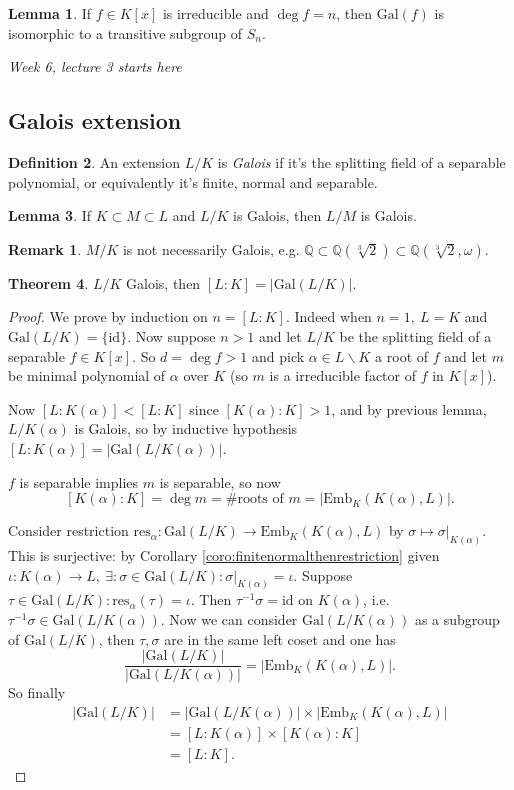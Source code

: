 \documentclass[a4paper]{article}
\newcommand{\Q}{\mathbb Q}
\newcommand{\gal}{\text{Gal}}
\newcommand{\emb}{\text{Emb}}
\newcommand{\id}{\text{id}}
\theoremstyle{definition}
\newtheorem{defn}{Definition}[subsection]
\newtheorem{thm}[defn]{Theorem}
\newtheorem{lemma}[defn]{Lemma}
\newtheorem*{remark}{Remark}
\begin{document}
\begin{lemma}
\label{lemma:irredthengalcongtrans}
If $f\in K[x]$ is irreducible and $\deg f=n$, then $\gal(f)$ is isomorphic to a transitive subgroup of $S_n$.
\end{lemma}

\begin{flushright}
\textit{Week 6, lecture 3 starts here}
\end{flushright}

\subsection{Galois extension}
\begin{defn}
An extension $L/K$ is \textit{Galois} if it's the splitting field of a separable polynomial, or equivalently it's finite, normal and separable.
\end{defn}
\begin{lemma}
\label{lemma:LKgalthenLMgal}
If $K\subset M\subset L$ and $L/K$ is Galois, then $L/M$ is Galois.
\end{lemma}
\begin{remark}
$M/K$ is not necessarily Galois, e.g. $\Q\subset \Q(\sqrt[3]2)\subset \Q(\sqrt[3]2,\omega)$.
\end{remark}

\begin{thm}
\label{thm:honkhonk}
$L/K$ Galois, then $[L:K]=|\gal(L/K)|$.
\end{thm}
\begin{proof}
We prove by induction on $n=[L:K]$. Indeed when $n=1,\ L=K$ and $\gal(L/K)=\{\id\}$. Now suppose $n>1$ and let $L/K$ be the splitting field of a separable $f\in K[x]$. So $d=\deg f>1$ and pick $\alpha\in L\backslash K$ a root of $f$ and let $m$ be minimal polynomial of $\alpha$ over $K$ (so $m$ is a irreducible factor of $f$ in $K[x]$).

Now $[L:K(\alpha)]<[L:K]$ since $[K(\alpha):K]>1$, and by previous lemma, $L/K(\alpha)$ is Galois, so by inductive hypothesis $[L:K(\alpha)]=|\gal(L/K(\alpha))|$.

$f$ is separable implies $m$ is separable, so now
\[
[K(\alpha):K]=\deg m=\# \text{roots of }m=|\emb_K(K(\alpha),L)|.
\]

Consider restriction $\text{res}_\alpha:\gal(L/K)\rightarrow \emb_K(K(\alpha),L)$ by $\sigma\mapsto\sigma|_{K(\alpha)}$. This is surjective: by Corollary \ref{coro:finitenormalthenrestriction} given $\iota:K(\alpha)\rightarrow L,\ \exists:\sigma\in\gal(L/K):\sigma|_{K(\alpha)}=\iota$. Suppose $\tau\in \gal(L/K):\text{res}_\alpha(\tau)=\iota$. Then $\tau^{-1}\sigma=\id$ on $K(\alpha)$, i.e. $\tau^{-1}\sigma\in\gal(L/K(\alpha))$. Now we can consider $\gal(L/K(\alpha))$ as a subgroup of $\gal(L/K)$, then $\tau,\sigma$ are in the same left coset and one has
\[
\frac{|\gal(L/K)|}{|\gal(L/K(\alpha))|}=|\emb_K(K(\alpha),L)|.
\] 
So finally
\[
\begin{aligned}
|\gal(L/K)|&=|\gal(L/K(\alpha))|\times |\emb_K(K(\alpha),L)|\\
&=[L:K(\alpha)]\times [K(\alpha):K]\\
&=[L:K].
\end{aligned}
\]
\end{proof}
\end{document}
